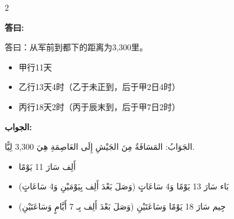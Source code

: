 \documentclass[11pt,a4paper]{article}
\newcommand{\ar}[1]{\arabicfont\beginR #1\endR}
\newenvironment{bilingual}{%
  \begin{paracol}{2}
}{%
  \end{paracol}
}
\newcommand{\cnlabel}[1]{\textcolor{algocolor}{\textbf{#1}}}
\newcommand{\arlabel}[1]{\ar{\textcolor{algocolor}{\textbf{#1}}}}
\begin{document}
\begin{bilingual}

\begin{leftcolumn*}
\cnlabel{答曰:}

答曰：从军前到都下的距离为3,300里。
\begin{itemize}
  \item 甲行11天
  \item 乙行13天4时（乙于未正到，后于甲2日4时）
  \item 丙行18天2时（丙于辰末到，后于甲7日2时）
\end{itemize}
\end{leftcolumn*}

\begin{rightcolumn*}
\arlabel{الجواب:}

\ar{الجَوَابُ: المَسَافَةُ مِنَ الجَيْشِ إِلَى العَاصِمَةِ هِيَ 3,300 لِيًّا.}
\begin{itemize}
  \item \ar{أَلِف سَارَ 11 يَوْمًا}
  \item \ar{بَاء سَارَ 13 يَوْمًا وَ4 سَاعَاتٍ (وَصَلَ بَعْدَ أَلِف بِيَوْمَيْنِ وَ4 سَاعَاتٍ)}
  \item \ar{جِيم سَارَ 18 يَوْمًا وَسَاعَتَيْنِ (وَصَلَ بَعْدَ أَلِف بِـ 7 أَيَّامٍ وَسَاعَتَيْنِ)}
\end{itemize}
\end{rightcolumn*}

\end{bilingual}

\vspace{1em}
\end{document}
